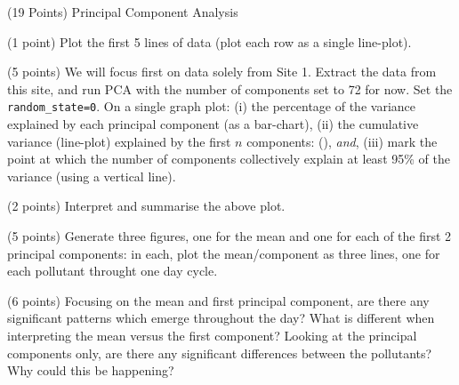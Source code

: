 \documentclass[12pt]{article}
\begin{document}
\begin{question}{(19 Points) Principal Component Analysis}
\begin{subquestion}{(1 point) Plot the first 5 lines of data (plot each row as a single line-plot).}
\end{subquestion}



\begin{subquestion}{(5 points) We will focus first on data solely from Site 1. Extract the data from this site, and run PCA with the number of components set to 72 for now. Set the \texttt{random\_state=0}. On a single graph plot: (i) the percentage of the variance explained by each principal component (as a bar-chart), (ii) the cumulative variance (line-plot) explained by the first $n$ components: (), \textsl{and}, (iii) mark the point at which the number of components collectively explain at least 95\% of the variance (using a vertical line). }






\end{subquestion}

\begin{subquestion}{(2 points) Interpret and summarise the above plot.}






\end{subquestion}


\begin{subquestion}{(5 points) Generate three figures, one for the mean and one for each of the first 2 principal components: in each, plot the mean/component as three lines, one for each pollutant throught one day cycle. }






\end{subquestion}

\begin{subquestion}{(6 points) Focusing on the mean and first principal component, are there any significant patterns which emerge throughout the day?  What is different when interpreting the mean versus the first component?  Looking at the principal components only, are there any significant differences between the pollutants? Why could this be happening? }






\end{subquestion}

\end{question}
\end{document}

